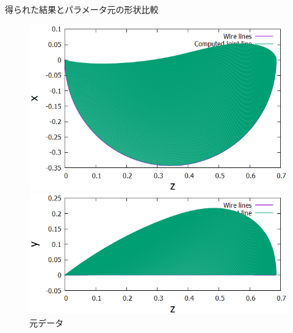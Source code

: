 \documentclass[11pt]{jsarticle}
\begin{document}
			
			
			得られた結果とパラメータ元の形状比較
			\begin{figure}
				\begin{minipage}{0.5\hsize}
					\centering
					\includegraphics[width = \columnwidth]{./figure/ObtainedRidgeLinefromz-x.png}
				\end{minipage}
				\begin{minipage}{0.5\hsize}
					\centering
					\includegraphics[width = \columnwidth]{./figure/ObtainedRidgeLinefromz-y.png}
				\end{minipage}
				\caption{元データ}
			\end{figure}
\end{document}
